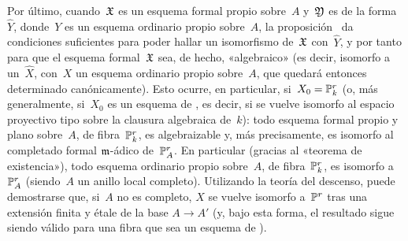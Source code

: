 Por último, cuando~$\mathfrak{X}$ es un esquema formal propio sobre~$A$ y~$\mathfrak{Y}$ es de la forma~$\widehat{Y}$, donde~$Y$ es un esquema ordinario propio sobre~$A$, la proposición~ da condiciones suficientes para poder hallar un isomorfismo de~$\mathfrak{X}$ con~$\widehat{Y}$, y por tanto para que el esquema formal~$\mathfrak{X}$ sea, de hecho, «algebraico» (es decir, isomorfo a un~$\widehat{X}$, con~$X$ un esquema ordinario propio sobre~$A$, que quedará entonces determinado canónicamente). Esto ocurre, en particular, si~$X_0=\mathbb P_k^r$ (o, más generalmente, si~$X_0$ es un esquema de
,
es decir, si se vuelve
isomorfo al espacio proyectivo tipo sobre la clausura algebraica de~$k$): todo esquema formal propio y plano sobre~$A$, de fibra~$\mathbb P_k^r$, es algebraizable y, más precisamente, es isomorfo al completado formal $\mathfrak{m}$-ádico de~$\mathbb P_A^r$. En particular (gracias al «teorema de existencia»), todo esquema ordinario propio sobre~$A$, de fibra~$\mathbb P_k^r$, es isomorfo a~$\mathbb P_A^r$ (siendo~$A$ un anillo local completo). Utilizando la teoría del descenso, puede demostrarse que, si~$A$ no es completo, $X$ se vuelve isomorfo a~$\mathbb P^r$ tras una extensión finita y étale de la base $A\to A'$ (y, bajo esta forma, el resultado sigue siendo válido para una fibra que sea un esquema de
).
